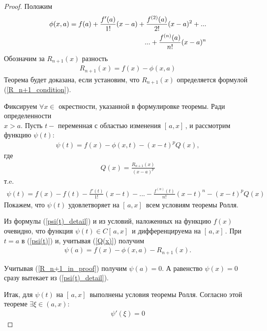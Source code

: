 \begin{proof}
    Положим
    \begin{align}
        \phi(x,a) = f(a) + \frac{f'(a)}{1!}(x-a) + \frac{f^{(2)}(a)}{2!}(x-a)^2 + ... \notag \\
        ... + \frac{f^{(n)}(a)}{n!}(x-a)^n
    \end{align}
    Обозначим за $R_{n+1}(x)$ разность
    \begin{align}\label{R_n+1_in_proof}
        R_{n+1}(x) = f(x) - \phi(x,a)
    \end{align}
    Теорема будет доказана, если установим, что $R_{n+1}(x)$ определяется формулой (\ref{R_n+1_condition}).

    Фиксируем $\forall x \in$ окрестности, указанной в формулировке теоремы. Ради определенности \\ \mathLet $x>a$. Пусть $t-$ переменная с областью изменения $[\,a, x]\,$, и рассмотрим функцию $\psi(t)$:
    \begin{align}\label{psi(t)}
        \psi(t) = f(x) - \phi(x,t) - (x-t)^pQ(x),
    \end{align}
    где
    \begin{align}\label{Q(x)}
        Q(x) = \frac{R_{n+1}(x)}{(x-a)^p}
    \end{align}
    т.e.
    \begin{align}\label{psi(t)_detail}
        \psi(t) = f(x) - f(t) - \frac{f'(t)}{1!}(x-t) - ... - \frac{f^{(n)}(t)}{n!}(x-t)^n - (x-t)^pQ(x)
    \end{align}
    Покажем, что $\psi(t)$ удовлетворяет на $[\,a,x]\,$ всем условиям теоремы Ролля.
    
    Из формулы (\ref{psi(t)_detail}) и из условий, наложенных на функцию $f(x)$ очевидно, что функция $\psi(t) \in C[\,a,x]\,$ и дифференцируема на $[\,a,x]\,$. При $t=a$ в (\ref{psi(t)}) и, учитывая (\ref{Q(x)}) получим
    \begin{align*}
        \psi(a) = f(x) - \phi(x,a) - R_{n+1}(x).
    \end{align*}
    
    Учитывая (\ref{R_n+1_in_proof}) получим $\psi(a) = 0$. А равенство $\psi(x) = 0$ сразу вытекает из (\ref{psi(t)_detail}).
    \bigbreak

    Итак, для $\psi(t)$ на  $[\,a,x]\,$ выполнены условия теоремы Ролля. Согласно этой теореме $\exists \xi \in (a,x): $
    \begin{align}\label{psi'(xi)}
        \psi'(\xi)=0
    \end{align}
    

\end{proof}
